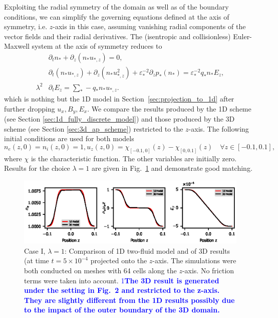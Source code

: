 \documentclass{article}
\def\ifUpdate{1}
\newcommand{\review}[1]{\textcolor{blue}{\if\ifUpdate1\textbf{#1}\fi}}
\begin{document}
Exploiting the radial symmetry of the domain as well as of the boundary conditions, we can
simplify the governing equations defined at the axis of symmetry, i.e. $z$-axis in this
case, assuming vanishing radial components of the vector fields and their radial
derivatives. The (isentropic and collisionless) Euler-Maxwell system at the axis of
symmetry reduces to
\begin{align*}
    &\partial_t n_* + \partial_z(n_*u_{*,z}) = 0, \\
    &\partial_t (n_* u_{*,z}) + \partial_z(n_*u_{*,z}^2) + \varepsilon_*^{-2} \partial_z p_*(n_*) = \varepsilon_*^{-2}q_*n_*E_z, \\
    \lambda^2 &\partial_t E_z = \sum_* - q_* n_* u_{*,z}.
\end{align*}
which is nothing but the 1D model in Section~\ref{sec:projection_to_1d} after further
dropping $u_x, B_y, E_x$. We compare the results produced by the 1D scheme (see Section
\ref{sec:1d_fully_discrete_model}) and those produced by the 3D scheme (see Section
\ref{sec:3d_ap_scheme}) restricted to the $z$-axis. The following initial conditions are
used for both models
\begin{equation*}
    n_e(z,0) = n_i(z,0) = 1, u_z(z,0) = \chi_{[-0.1,0]}(z) - \chi_{[0,0.1]}(z)\quad \forall z \in [-0.1,0.1],
\end{equation*}
where $\chi$ is the characteristic function. The other variables are initially
zero. Results for the choice $\lambda = 1$ are given in Fig.~\ref{fig:z_axis_reduction}
and demonstrate good matching.

\begin{figure}
    \centering
    \includegraphics[scale=1.2]{z_axis_reduction.eps}
    \caption{Case I, $\lambda = 1$: Comparison of 1D two-fluid model and of 3D results (at
      time $t = 5 \times 10^{-4}$ projected onto the $z$-axis. The simulations were both
      conducted on meshes with 64 cells along the $z$-axis. No friction terms were taken
      into account. \review{The 3D result is generated under the setting in Fig.~2
  and restricted to the z-axis. They are slightly different from
  the 1D results possibly due to the impact of the outer boundary of the
  3D domain.}}
    \label{fig:z_axis_reduction}
\end{figure}
\end{document}
